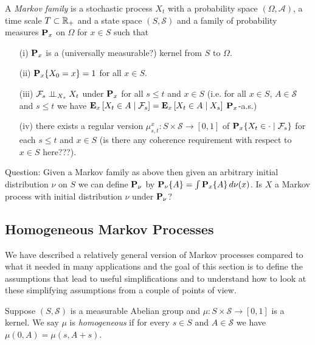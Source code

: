 \begin{defn}
A \emph{Markov family} is a stochastic process $X_t$ with a
probability space $(\Omega, \mathcal{A})$, a time scale $T
\subset \reals_+$ and a state space $(S, \mathcal{S})$ and a family of
probability measures $\probabilityop_x$ on $\Omega$ for $x \in S$ such that 
\begin{itemize}
\item[(i)]$\probabilityop_x$ is a (universally measurable?) kernel
  from $S$ to $\Omega$.
\item[(ii)]$\sprobability{X_0 = x}{x} = 1$ for all $x \in S$.
\item[(iii)]$\cindependent{\mathcal{F}_s}{X_t}{X_s}$ under
  $\probabilityop_x$ for all $s \leq
  t$ and $x \in S$ (i.e. for all $x \in S$, $A \in \mathcal{S}$ and $s \leq t$ we have
  $\csexpectationlong{\mathcal{F}_s}{X_t \in A}{x} =
  \csexpectationlong{X_s}{X_t \in A}{x}$ $\probabilityop_x$-a.s.)
\item[(iv)]there exists a regular version $\mu^x_{s,t} :
  S \times \mathcal{S} \to [0,1]$ of $\csprobability{\mathcal{F}_s}{X_t
    \in \cdot}{x}$ for each $s \leq t$ and $x \in S$ (is there any coherence
  requirement with respect to $x \in S$ here???).
\end{itemize}
\end{defn}

Question:  Given a Markov family as above then given an arbitrary
initial distribution $\nu$ on $S$ we can define $\probabilityop_\nu$
by $\sprobability{A}{\nu} = \int \sprobability{A}{x} \, d\nu(x)$.  Is
$X$ a Markov process with initial distribution $\nu$ under
$\probabilityop_\nu$?

\subsection{Homogeneous Markov Processes}

We have described a relatively general version of Markov processes
compared to what it needed in many applications and the goal of this
section is to define the assumptions that lead to useful
simplifications and to understand how to look at these simplifying
assumptions from a couple of points of view.

\begin{defn}Suppose $(S, \mathcal{S})$ is a measurable Abelian group
  and $\mu : S \times \mathcal{S} \to [0,1]$ is a kernel.  We say
  $\mu$ is \emph{homogeneous} if for every $s \in S$ and
  $A\in \mathcal{S}$ we have $\mu(0, A) = \mu(s, A+s)$.
\end{defn}

